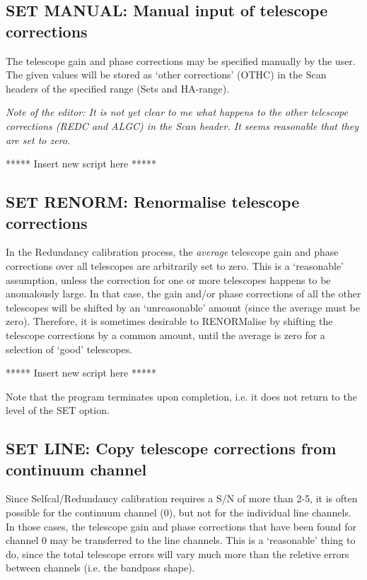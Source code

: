 \subsection{SET MANUAL: Manual input of telescope corrections}
\label{.set.manual}

The telescope gain and phase corrections may be specified manually by the user.
The given values will be stored as `other corrections' (OTHC) in the Scan
headers of the specified range (Sets and HA-range).

{\it Note of the editor: It is not yet clear to me what happens to the other
telescope corrections (REDC and ALGC) in the Scan header. It seems reasonable
that they are set to zero.}

***** Insert new script here *****


\subsection{SET RENORM: Renormalise telescope corrections}
\label{.set.renorm}

In the Redundancy calibration process, the {\em average} telescope gain and
phase corrections over all telescopes are arbitrarily set to zero. This is a
`reasonable' assumption, unless the correction for one or more telescopes
happens to be  anomalously large. In that case, the gain and/or phase
corrections of all the other telescopes will be shifted by an `unreasonable'
amount (since the average must be zero). Therefore, it is sometimes desirable
to RENORMalise by shifting the telescope corrections by a common amount, until
the average is zero for a selection of `good' telescopes.


***** Insert new script here *****

Note that the program terminates upon completion, i.e. it does not return to
the level of the SET option.



\subsection{SET LINE: Copy telescope corrections from continuum channel}
\label{.set.line}

Since Selfcal/Redundancy calibration requires a S/N of more than 2-5, it is
often possible for the continuum channel (0), but not for the individual line
channels. In those cases, the telescope gain and phase corrections that have
been found for channel 0 may be transferred to the line channels. This is a
`reasonable' thing to do, since the total telescope errors will vary much more
than the reletive errors between channels (i.e. the bandpass shape).

